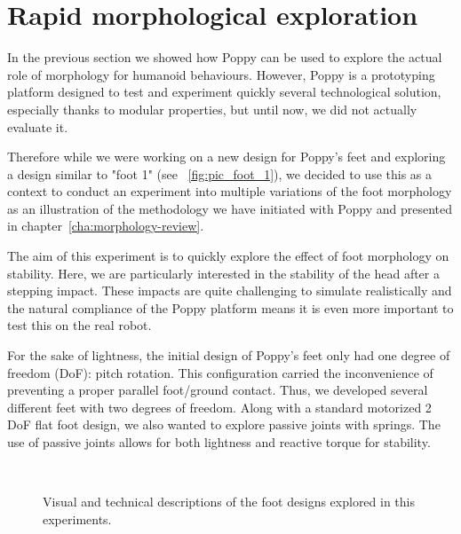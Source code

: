 
\newpage
\section{Rapid morphological exploration} %
\label{sec:morphology-variable}

In the previous section we showed how Poppy can be used to explore the actual role of morphology for humanoid behaviours. However, Poppy is a prototyping platform designed to test and experiment quickly several technological solution, especially thanks to modular properties, but until now, we did not actually evaluate it.

Therefore while we were working on a new design for Poppy's feet and exploring a design similar to "foot 1" (see \figurename~\ref{fig:pic_foot_1}), we decided to use this as a context to conduct an experiment into multiple variations of the foot morphology as an illustration of the methodology we have initiated with Poppy and presented in chapter~\ref{cha:morphology-review}.


The aim of this experiment is to quickly explore the effect of foot morphology on stability. Here, we are particularly interested in the stability of the head after a stepping impact. These impacts are quite challenging to simulate realistically and the natural compliance of the Poppy platform means it is even more important to test this on the real robot.

For the sake of lightness, the initial design of Poppy's feet only had one degree of freedom (DoF): pitch rotation. This configuration carried the inconvenience of preventing a proper parallel foot/ground contact. Thus, we developed several different feet with two degrees of freedom. Along with a standard motorized 2 DoF flat foot design, we also wanted to explore passive joints with springs. The use of passive joints allows for both lightness and reactive torque for stability.


\begin{figure}[p]
\centering
    \hfil
    \\
    \hfil


    \caption{Visual and technical descriptions of the foot designs explored in this experiments.}
    \label{fig:foot_variants}
\end{figure}


